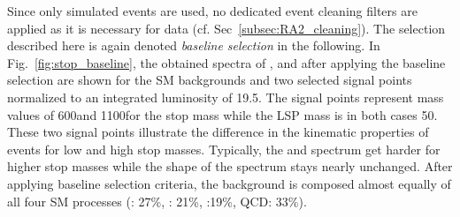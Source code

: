 Since only simulated events are used, no dedicated event cleaning filters are applied as it is necessary for data (cf. Sec~\ref{subsec:RA2_cleaning}). The selection described here is again denoted \textit{baseline selection} in the following. In Fig.~\ref{fig:stop_baseline}, the obtained spectra of \HT, \met and \NJets after applying the baseline selection are shown for the SM backgrounds and two selected signal points normalized to an integrated luminosity of 19.5\fbinv. The signal points represent mass values of 600\gev and 1100\gev for the stop mass while the LSP mass is in both cases 50\gev. These two signal points illustrate the difference in the kinematic properties of events for low and high stop masses. Typically, the \HT and \met spectrum get harder for higher stop masses while the shape of the \NJets spectrum stays nearly unchanged. After applying baseline selection criteria, the background is composed almost equally of all four SM processes (\ttbar: 27\%, \WJets: 21\%, \ZJets:19\%, QCD: 33\%).
